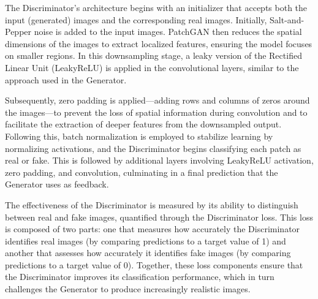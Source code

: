 The Discriminator’s architecture begins with an initializer that accepts both the input (generated) images and the corresponding real images. Initially, Salt-and-Pepper noise is added to the input images. PatchGAN then reduces the spatial dimensions of the images to extract localized features, ensuring the model focuses on smaller regions. In this downsampling stage, a leaky version of the Rectified Linear Unit (LeakyReLU) is applied in the convolutional layers, similar to the approach used in the Generator.

Subsequently, zero padding is applied—adding rows and columns of zeros around the images—to prevent the loss of spatial information during convolution and to facilitate the extraction of deeper features from the downsampled output. Following this, batch normalization is employed to stabilize learning by normalizing activations, and the Discriminator begins classifying each patch as real or fake. This is followed by additional layers involving LeakyReLU activation, zero padding, and convolution, culminating in a final prediction that the Generator uses as feedback.

The effectiveness of the Discriminator is measured by its ability to distinguish between real and fake images, quantified through the Discriminator loss. This loss is composed of two parts: one that measures how accurately the Discriminator identifies real images (by comparing predictions to a target value of 1) and another that assesses how accurately it identifies fake images (by comparing predictions to a target value of 0). Together, these loss components ensure that the Discriminator improves its classification performance, which in turn challenges the Generator to produce increasingly realistic images.
